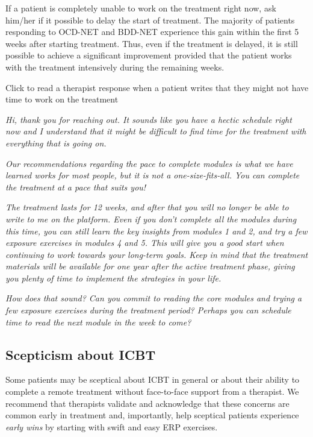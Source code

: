 \documentclass[]{book}
\begin{document}
If a patient is completely unable to work on the treatment right now, ask him/her if it possible to delay the start of treatment. The majority of patients responding to OCD-NET and BDD-NET experience this gain within the first 5 weeks after starting treatment. Thus, even if the treatment is delayed, it is still possible to achieve a significant improvement provided that the patient works with the treatment intensively during the remaining weeks.

 Click to read a therapist response when a patient writes that they might not have time to work on the treatment

\emph{Hi, thank you for reaching out. It sounds like you have a hectic schedule right now and I understand that it might be difficult to find time for the treatment with everything that is going on.}

\emph{Our recommendations regarding the pace to complete modules is what we have learned works for most people, but it is not a one-size-fits-all. You can complete the treatment at a pace that suits you!}

\emph{The treatment lasts for 12 weeks, and after that you will no longer be able to write to me on the platform. Even if you don't complete all the modules during this time, you can still learn the key insights from modules 1 and 2, and try a few exposure exercises in modules 4 and 5. This will give you a good start when continuing to work towards your long-term goals. Keep in mind that the treatment materials will be available for one year after the active treatment phase, giving you plenty of time to implement the strategies in your life.}

\emph{How does that sound? Can you commit to reading the core modules and trying a few exposure exercises during the treatment period? Perhaps you can schedule time to read the next module in the week to come?}

\hypertarget{scepticism-about-icbt}{%
\subsection{Scepticism about ICBT}\label{scepticism-about-icbt}}

Some patients may be sceptical about ICBT in general or about their ability to complete a remote treatment without face-to-face support from a therapist. We recommend that therapists validate and acknowledge that these concerns are common early in treatment and, importantly, help sceptical patients experience \emph{early wins} by starting with swift and easy ERP exercises.
\end{document}
